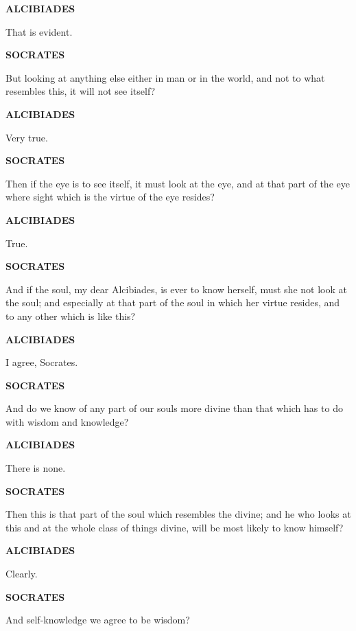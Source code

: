 \documentclass[11pt,letter]{article}
\begin{document}
\par \textbf{ALCIBIADES}
\par   That is evident.

\par \textbf{SOCRATES}
\par   But looking at anything else either in man or in the world, and not to what resembles this, it will not see itself?

\par \textbf{ALCIBIADES}
\par   Very true.

\par \textbf{SOCRATES}
\par   Then if the eye is to see itself, it must look at the eye, and at that part of the eye where sight which is the virtue of the eye resides?

\par \textbf{ALCIBIADES}
\par   True.

\par \textbf{SOCRATES}
\par   And if the soul, my dear Alcibiades, is ever to know herself, must she not look at the soul; and especially at that part of the soul in which her virtue resides, and to any other which is like this?

\par \textbf{ALCIBIADES}
\par   I agree, Socrates.

\par \textbf{SOCRATES}
\par   And do we know of any part of our souls more divine than that which has to do with wisdom and knowledge?

\par \textbf{ALCIBIADES}
\par   There is none.

\par \textbf{SOCRATES}
\par   Then this is that part of the soul which resembles the divine; and he who looks at this and at the whole class of things divine, will be most likely to know himself?

\par \textbf{ALCIBIADES}
\par   Clearly.

\par \textbf{SOCRATES}
\par   And self-knowledge we agree to be wisdom?
\end{document}
